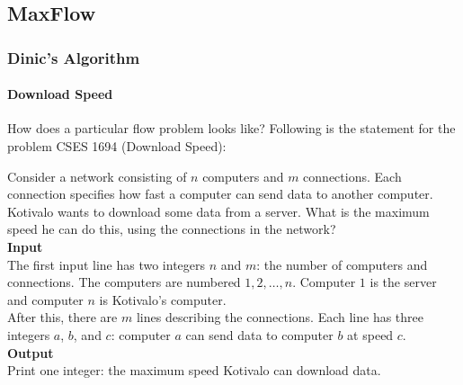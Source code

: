 \documentclass[letterpaper,landscape]{article}
\begin{document}
\subsection{MaxFlow}

\subsubsection{Dinic's Algorithm}



\paragraph{Download Speed}

How does a particular flow problem looks like?
Following is the statement for the problem CSES 1694 (Download Speed):

\begin{IOFrame}
\sffamily\raggedright
\setlength{\parindent}{0pt}
\setlength{\parskip}{0.4em}
Consider a network consisting of $n$ computers and $m$ connections. Each connection specifies how fast a computer can send data to another computer. \\[0.2cm]
Kotivalo wants to download some data from a server. What is the maximum speed he can do this, using the connections in the network? \\

\textbf{Input} \\[0.1cm]

\noindent The first input line has two integers $n$ and $m$: the number of computers and connections. The computers are numbered $1,2,\dots,n$. Computer $1$ is the server and computer $n$ is Kotivalo's computer. \\[0.2cm]
After this, there are $m$ lines describing the connections. Each line has three integers $a$, $b$, and $c$: computer $a$ can send data to computer $b$ at speed $c$. \\

\textbf{Output} \\[0.1cm]

\noindent Print one integer: the maximum speed Kotivalo can download data.
\end{IOFrame}
\end{document}
